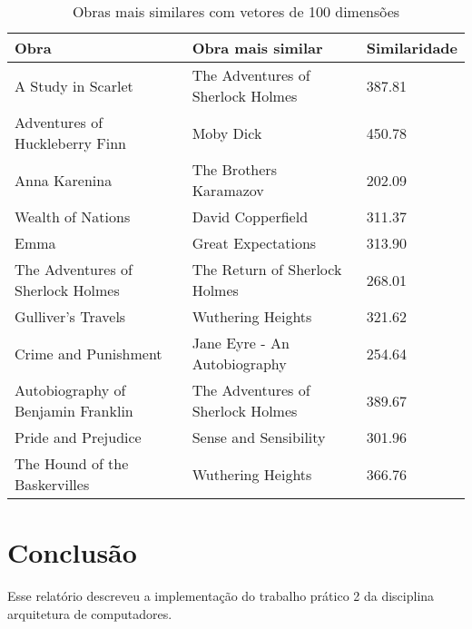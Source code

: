 \documentclass{article}
\begin{document}
\begin{table}[h]
  \begin{center}
    \tiny
    \begin{tabular}{ | l | l | l |}
    \hline
    Obra & Obra mais similar & Similaridade \\ 
    \hline
    A Study in Scarlet & The Adventures of Sherlock Holmes & 387.81 \\
    Adventures of Huckleberry Finn & Moby Dick & 450.78 \\
    Anna Karenina & The Brothers Karamazov & 202.09 \\
    Wealth of Nations & David Copperfield & 311.37 \\
    Emma & Great Expectations & 313.90 \\
    The Adventures of Sherlock Holmes & The Return of Sherlock Holmes & 268.01 \\
    Gulliver's Travels & Wuthering Heights & 321.62 \\
    Crime and Punishment & Jane Eyre - An Autobiography & 254.64 \\
    Autobiography of Benjamin Franklin & The Adventures of Sherlock Holmes & 389.67 \\
    Pride and Prejudice & Sense and Sensibility & 301.96 \\
    The Hound of the Baskervilles & Wuthering Heights & 366.76 \\
    \hline
    \end{tabular}
    \caption{Obras mais similares com vetores de 100 dimensões} 
    \label{tab:most_similar_100}
  \end{center}
\end{table}

\section{Conclusão}

Esse relatório descreveu a implementação do trabalho prático 2 da disciplina arquitetura de computadores.
\end{document}
